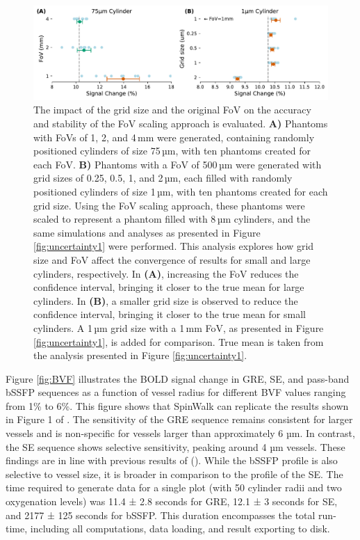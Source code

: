 \begin{figure}[!htbp]
    \centering
    \includegraphics[width=\textwidth]{fig2_uncertainty2.pdf}
    \caption{The impact of the grid size and the original FoV on the accuracy and stability of the FoV scaling approach is evaluated. \textbf{A)} Phantoms with FoVs of 1, 2, and 4\,mm were generated, containing randomly positioned cylinders of size 75\,µm, with ten phantoms created for each FoV. \textbf{B)} Phantoms with a FoV of 500\,µm were generated with grid sizes of 0.25, 0.5, 1, and 2\,µm, each filled with randomly positioned cylinders of size 1\,µm, with ten phantoms created for each grid size. Using the FoV scaling approach, these phantoms were scaled to represent a phantom filled with 8\,µm cylinders, and the same simulations and analyses as presented in Figure \ref{fig:uncertainty1} were performed. This analysis explores how grid size and FoV affect the convergence of results for small and large cylinders, respectively. In \textbf{(A)}, increasing the FoV reduces the confidence interval, bringing it closer to the true mean for large cylinders. In \textbf{(B)}, a smaller grid size is observed to reduce the confidence interval, bringing it closer to the true mean for small cylinders. A 1\,µm grid size with a 1\,mm FoV, as presented in Figure \ref{fig:uncertainty1}, is added for comparison. True mean is taken from the analysis presented in Figure \ref{fig:uncertainty1}.}
    \label{fig:uncertainty2}
\end{figure}

Figure \ref{fig:BVF} illustrates the BOLD signal change in GRE, SE, and pass-band bSSFP sequences as a function of vessel radius for different BVF values ranging from 1\% to 6\%. This figure shows that SpinWalk can replicate the results shown in Figure 1 of \cite{baez2017impact}. The sensitivity of the GRE sequence remains consistent for larger vessels and is non-specific for vessels larger than approximately 6 µm. In contrast, the SE sequence shows selective sensitivity, peaking around 4 µm vessels. These findings are in line with previous results of (\cite{baez2017impact, boxerman1995mr, weisskoff1994microscopic}). While the bSSFP profile is also selective to vessel size, it is broader in comparison to the profile of the SE. The time required to generate data for a single plot (with 50 cylinder radii and two oxygenation levels) was 11.4 ± 2.8 seconds for GRE, 12.1 ± 3 seconds for SE, and 2177 ± 125 seconds for bSSFP. This duration encompasses the total run-time, including all computations, data loading, and result exporting to disk.


